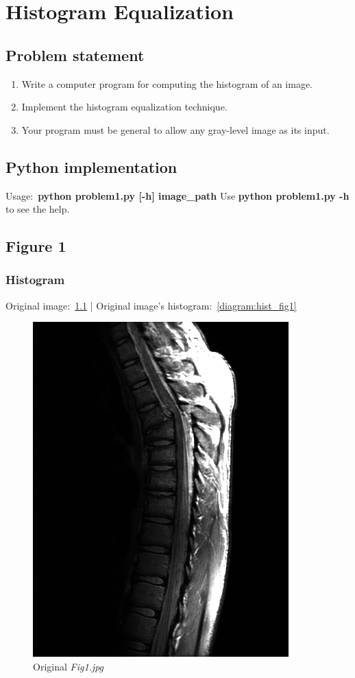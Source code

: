 \chapter{Histogram Equalization}

\section{Problem statement}

\begin{enumerate}
    \item Write a computer program for computing the histogram of an image.\\
    \item Implement the histogram equalization technique.\\
    \item Your program must be general to allow any gray-level image as its input.\\
\end{enumerate}

\section{Python implementation}

Usage:~\textbf{python problem1.py [-h] image\_path}
Use \textbf{python problem1.py -h} to see the help.

\pagebreak
\section{Figure 1}

    \subsection{Histogram}

    Original image:~\ref{diagram:fig1} |
    Original image's histogram:~\ref{diagram:hist_fig1}

    \begin{figure}[!htb]\centering
        \includegraphics[width=0.5\linewidth]{./images/1/Fig1.jpg}
        \caption{Original \textit{Fig1.jpg}}\label{diagram:fig1}
    \end{figure}

